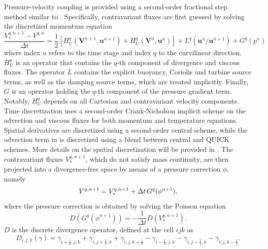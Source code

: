 Pressure-velocity coupling is provided using a second-order fractional step method similar to \cite{vanKan1986}. Specifically, contravariant fluxes are first guessed by solving the discretized momentum equation
\begin{equation}
	\frac{V^{q,n+1}_* - V^{q,n}}{\Delta t} = \frac{1}{2}\left[H^q_U(\mathbf{V}^{n+1},\mathbf{u}^{n+1}) + H^q_U(\mathbf{V}^{n},\mathbf{u}^{n})\right] + L^{q}(\mathbf{u}^n/\mathbf{u}^{n+1}) + G^{q}(p^n) \label{eq:spatialDiscrMomentum}
\end{equation}
where index $n$ refers to the time stage and index $q$ to the curvilinear direction. $H^q_U$ is an operator that contains the $q$-th component of divergence and viscous fluxes. The operator $L$ contains the explicit buoyancy, Coriolis and turbine source terms, as well as the damping source terms, which are treated implicitly. Finally, $G$ is an operator holding the $q$-th component of the pressure gradient term. Notably, $H^q_U$ depends on all Cartesian and contravariant velocity components. Time discretization uses a second-order Crank-Nicholson implicit scheme on the advection and viscous fluxes for both momentum and temperature equations. Spatial derivatives are discretized using a second-order central scheme, while the advection term in  is discretized using a blend between central and QUICK \citep{Leonard1979} schemes. More details on the spatial discretization will be provided in . The contravariant fluxes $V^{q,n+1}_*$, which do not satisfy mass continuity, are then projected into a divergence-free space by means of a pressure correction $\phi$, namely
\begin{equation}
	V^{q,n+1} = V^{q,n+1}_* + \Delta t\hspace{0.5mm}G^q(\phi^{n+1}), \label{eq:velocityProjection}
\end{equation}
where the pressure correction is obtained by solving the Poisson equation
\begin{equation}
	D\left(G^{q}(\phi^{n+1})\right) = - \frac{1}{\Delta t} D\left(V^{q,n+1}_*\right). \label{eq:discrPoisson}
\end{equation}
$D$ is the discrete divergence operator, defined at the cell $ijk$ as 
\begin{equation}
	D_{i,j,k}\left(\gamma\right) = \gamma_{i+\frac{1}{2},j,k}  + \gamma_{i,j+\frac{1}{2},k} + \gamma_{i,j,k+\frac{1}{2}} - \gamma_{i-\frac{1}{2},j,k} - \gamma_{i,j-\frac{1}{2},k} - \gamma_{i,j,k-\frac{1}{2}}. \label{eq:discreteDivOperator}
\end{equation}
